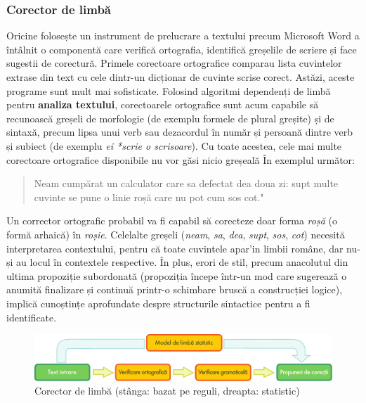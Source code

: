 \documentclass[]{../../metanetpaper}
\begin{document}
\begin{multicols}{2}
\subsubsection{Corector de limbă}
Oricine folosește un instrument de prelucrare a textului precum Microsoft Word a întâlnit o componentă care verifică ortografia, identifică greșelile de scriere și face sugestii de corectură. Primele corectoare ortografice comparau lista cuvintelor extrase din text cu cele dintr-un dicționar de cuvinte scrise corect. Astăzi, aceste programe sunt mult mai sofisticate. Folosind algoritmi dependenți de limbă pentru \textbf{analiza textului}, corectoarele ortografice sunt acum capabile să recunoască greșeli de morfologie (de exemplu formele de plural greșite) și de sintaxă, precum lipsa unui verb sau dezacordul în număr și persoană dintre verb și subiect (de exemplu \textit{ei *scrie o scrisoare}). Cu toate acestea, cele mai multe corectoare ortografice disponibile nu vor găsi nicio greșeală În exemplul următor:
 
\begin{quote}
Neam cumpărat un calculator care sa defectat dea doua zi: supt multe cuvinte se pune o linie roșă care nu pot cum sos cot."\end{quote}

Un corrector ortografic probabil va fi capabil să corecteze doar forma \textit{roșă} (o formă arhaică) în \textit{roșie}. Celelalte greșeli (\textit{neam}, \textit{sa}, \textit{dea}, \textit{supt}, \textit{sos}, \textit{cot}) necesită interpretarea contextului, pentru că toate cuvintele apar'in limbii române, dar nu-și au locul în contextele respective. În plus, erori de stil, precum anacolutul din ultima propoziție subordonată (propoziția începe într-un mod care sugerează o anumită finalizare și continuă printr-o schimbare bruscă a construcției logice), implică cunoștințe aprofundate despre structurile sintactice pentru a fi identificate.

\begin{figure}[htb]
\center
\includegraphics[width=\textwidth]{../_media/romanian/language_checking}
\caption{Corector de limbă (stânga: bazat pe reguli, dreapta: statistic)}
\label{fig:langcheckingaarch_de}
\end{figure}


\end{multicols}
\end{document}
